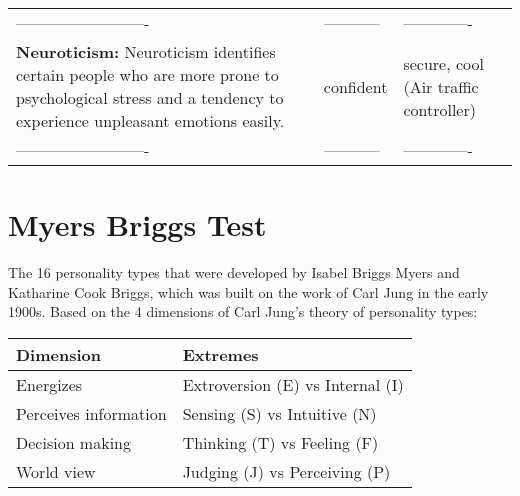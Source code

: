 \documentclass[]{book}
\begin{document}
\begin{longtable}[]{@{}lll@{}}
\begin{minipage}[t]{0.44\columnwidth}
-------------------------\strut
\end{minipage} & \begin{minipage}[t]{0.28\columnwidth}\raggedright
-----------\strut
\end{minipage} & \begin{minipage}[t]{0.20\columnwidth}\raggedright
-------------\strut
\end{minipage}\tabularnewline
\begin{minipage}[t]{0.44\columnwidth}\raggedright
\textbf{Neuroticism:} Neuroticism identifies certain people who are more prone to psychological stress and a tendency to experience unpleasant emotions easily.\strut
\end{minipage} & \begin{minipage}[t]{0.28\columnwidth}\raggedright
confident\strut
\end{minipage} & \begin{minipage}[t]{0.20\columnwidth}\raggedright
secure, cool (Air traffic controller)\strut
\end{minipage}\tabularnewline
\begin{minipage}[t]{0.44\columnwidth}\raggedright
-------------------------\strut
\end{minipage} & \begin{minipage}[t]{0.28\columnwidth}\raggedright
-----------\strut
\end{minipage} & \begin{minipage}[t]{0.20\columnwidth}\raggedright
-------------\strut
\end{minipage}\tabularnewline
\bottomrule
\end{longtable}

\hypertarget{myers-briggs-test}{%
\section{Myers Briggs Test}\label{myers-briggs-test}}

The 16 personality types that were developed by Isabel Briggs Myers and Katharine Cook Briggs, which was built on the work of Carl Jung in the early 1900s. Based on the 4 dimensions of Carl Jung's theory of personality types:

\begin{longtable}[]{@{}ll@{}}
\toprule
Dimension & Extremes\tabularnewline
\midrule
\endhead
Energizes & Extroversion (E) vs Internal (I)\tabularnewline
Perceives information & Sensing (S) vs Intuitive (N)\tabularnewline
Decision making & Thinking (T) vs Feeling (F)\tabularnewline
World view & Judging (J) vs Perceiving (P)\tabularnewline
\bottomrule
\end{longtable}
\end{document}
